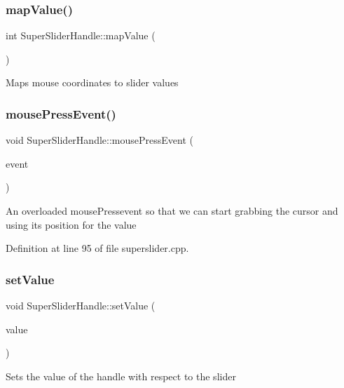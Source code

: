 \subsubsection{\texorpdfstring{map\+Value()}{mapValue()}}
{\footnotesize\ttfamily int Super\+Slider\+Handle\+::map\+Value (\begin{DoxyParamCaption}{ }\end{DoxyParamCaption})}

Maps mouse coordinates to slider values \mbox{\label{class_super_slider_handle_a4e6bf0699c88598690bbfcd10c2de0a0}} 
\subsubsection{\texorpdfstring{mouse\+Press\+Event()}{mousePressEvent()}}
{\footnotesize\ttfamily void Super\+Slider\+Handle\+::mouse\+Press\+Event (\begin{DoxyParamCaption}\item[{Q\+Mouse\+Event $\ast$}]{event }\end{DoxyParamCaption})}

An overloaded mouse\+Pressevent so that we can start grabbing the cursor and using it\textquotesingle{}s position for the value 

Definition at line 95 of file superslider.\+cpp.

\mbox{\label{class_super_slider_handle_ac207cf8a1eb0a5412de13021cd8befda}} 
\subsubsection{\texorpdfstring{set\+Value}{setValue}}
{\footnotesize\ttfamily void Super\+Slider\+Handle\+::set\+Value (\begin{DoxyParamCaption}\item[{double}]{value }\end{DoxyParamCaption})\hspace{0.3cm}{\ttfamily [slot]}}

Sets the value of the handle with respect to the slider 

